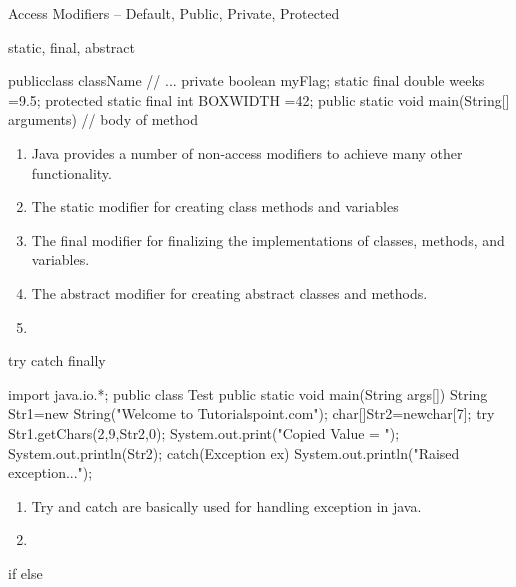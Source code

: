 \documentclass[11pt]{beamer}
\begin{document}
\begin{frame}{Access Modifiers -- Default, Public, Private, Protected}
\begin{frame}{static, final, abstract}

\begin{java}
	publicclass className {
// ...
}
private boolean myFlag;
static final double weeks =9.5;
protected static final int BOXWIDTH =42;
public static void main(String[] arguments){
// body of method
}

\end{java}

\begin{enumerate}
\item Java provides a number of non-access modifiers to achieve many other functionality.
\item The static modifier for creating class methods and variables 
\item The final modifier for finalizing the implementations of classes, methods, and variables.
\item The abstract modifier for creating abstract classes and methods.
\item 


\end{enumerate}
\end{frame}



\begin{frame}[containsverbatim]{try catch finally}

\begin{java}

import java.io.*;
public class Test{
public static void main(String args[]){
String Str1=new String("Welcome to Tutorialspoint.com");
char[]Str2=newchar[7];
try{
Str1.getChars(2,9,Str2,0);
System.out.print("Copied Value = ");
System.out.println(Str2);
}catch(Exception ex){
System.out.println("Raised exception...");
}
}
}

\begin{enumerate}
\item Try and catch are basically used for handling exception in java.
\item 


\end{enumerate}


\end{java}



\end{frame}


\begin{frame}{if else}


\end{frame}
\end{frame}
\end{document}
